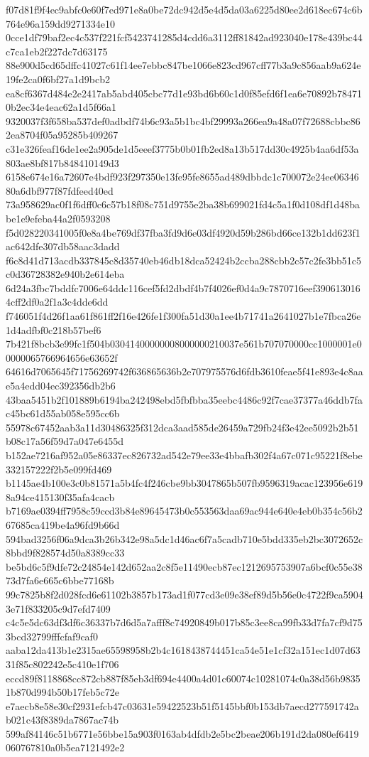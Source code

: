 {f07d81f9f4ec9abfc0e60f7ed971e8a0be72dc942d5e4d5da03a6225d80ee2d618ec674c6b764e96a159dd9271334e10
0cce1df79baf2ec4c537f221fcf5423741285d4cdd6a3112ff81842ad923040e178e439bc44c7ca1eb2f227dc7d63175
88e900d5cd65dffc41027c61f14ee7ebbc847be1066e823cd967cff77b3a9c856aab9a624e19fe2ca0f6bf27a1d9bcb2
ea8cf6367d484e2e2417ab5abd405cbc77d1e93bd6b60c1d0f85efd6f1ea6e70892b784710b2ec34e4eac62a1d5f66a1
9320037f3f658ba537def0adbdf74b6c93a5b1bc4bf29993a266ea9a48a07f72688cbbc862ea8704f05a95285b409267
c31e326feaf16de1ee2a905de1d5eeef3775b0b01fb2ed8a13b517dd30c4925b4aa6df53a803ae8bf817b848410149d3
6158e674e16a72607e4bdf923f297350e13fe95fe8655ad489dbbdc1c700072e24ee0634680a6dbf977f87fdfeed40ed
73a958629ac0f1f6dff0c6c57b18f08c751d9755e2ba38b699021fd4c5a1f0d108df1d48babe1e9efeba44a2f0593208
f5d028220341005f0e8a4be769df37fba3fd9d6e03df4920d59b286bd66ce132b1dd623f1ac642dfe307db58aac3dadd
f6c8d41d713acdb337845c8d35740eb46db18dca52424b2ccba288cbb2c57c2fe3bb51c5c0d36728382e940b2e614eba
6d24a3fbc7bddfc7006e64ddc116cef5fd2dbdf4b7f4026ef0d4a9c7870716eef3906130164cff2df0a2f1a3c4dde6dd
f746051f4d26f1aa61f861ff2f16e426fe1f300fa51d30a1ee4b71741a2641027b1e7fbca26e1d4adfbf0c218b57bef6
7b421f8bcb3e99fc1f504b03041400000008000000210037e561b707070000cc1000001e00000065766964656e63652f
64616d7065645f71756269742f636865636b2e707975576d6fdb3610feae5f41e893e4c8aae5a4edd04ec392356db2b6
43baa5451b2f101889b6194ba242498ebd5fbfbba35eebc4486c92f7cae37377a46ddb7fac45bc61d55ab058e595cc6b
55978c67452aab3a11d30486325f312dca3aad585de26459a729fb24f3e42ee5092b2b51b08c17a56f59d7a047e6455d
b152ae7216af952a05e86337ec826732ad542e79ee33e4bbafb302f4a67c071c95221f8ebe332157222f2b5e099fd469
b1145ae4b100e3c0b81571a5b4fc4f246cbe9bb3047865b507fb9596319acac123956e6198a94ce415130f35afa4cacb
b7169ae0394ff7958c59ccd3b84e89645473b0c553563daa69ac944e640e4eb0b354c56b267685ca419be4a96fd9b66d
594bad3256f06a9dca3b26b342e98a5dc1d46ac6f7a5cadb710e5bdd335eb2bc3072652c8bbd9f828574d50a8389cc33
be5bd6c5f9dfe72c24854e142d652aa2c8f5e11490ecb87ec1212695753907a6bcf0c55e3873d7fa6e665c6bbe77168b
99c7825b8f2d028fcd6e61102b3857b173ad1f077cd3e09e38ef89d5b56e0c4722f9ca59043e71f833205c9d7efd7409
c4c5e5dc63df3df6c36337b7d6d5a7afff8c74920849b017b85c3ee8ca99fb33d7fa7cf9d753bcd32799fffcfaf9caf0
aaba12da413b1e2315ae65598958b2b4c1618438744451ca54e51e1cf32a151ec1d07d6331f85c802242e5c410e1f706
eccd89f8118868cc872cb887f85eb3df694e4400a4d01c60074c10281074c0a38d56b98351b870d994b50b17feb5c72e
e7aecb8e58e30cf2931efcb47c03631e59422523b51f5145bbf0b153db7aecd277591742ab021c43f8389da7867ac74b
599af84146c51b6771e56bbe15a903f0163ab4dfdb2e5bc2beae206b191d2da080ef6419060767810a0b5ea7121492e2
}
